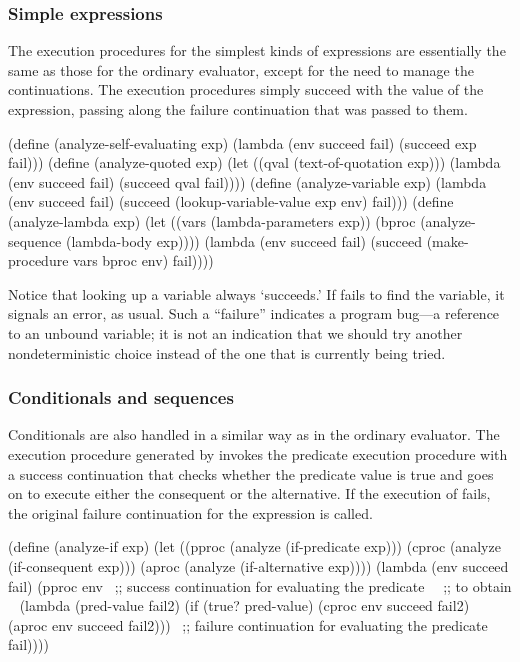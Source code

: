 \subsubsection*{Simple expressions}

The execution procedures for the simplest kinds of expressions are essentially
the same as those for the ordinary evaluator, except for the need to manage the
continuations.  The execution procedures simply succeed with the value of the
expression, passing along the failure continuation that was passed to them.

\begin{codeBlock}
(define (analyze-self-evaluating exp)
  (lambda (env succeed fail)
    (succeed exp fail)))
(define (analyze-quoted exp)
  (let ((qval (text-of-quotation exp)))
    (lambda (env succeed fail)
      (succeed qval fail))))
(define (analyze-variable exp)
  (lambda (env succeed fail)
    (succeed (lookup-variable-value exp env) fail)))
(define (analyze-lambda exp)
  (let ((vars (lambda-parameters exp))
        (bproc (analyze-sequence (lambda-body exp))))
    (lambda (env succeed fail)
      (succeed (make-procedure vars bproc env) fail))))
\end{codeBlock}

\noindent
Notice that looking up a variable always `succeeds.'  If
 fails to find the variable, it signals an error,
as usual.  Such a ``failure'' indicates a program bug---a reference to an
unbound variable; it is not an indication that we should try another
nondeterministic choice instead of the one that is currently being tried.

\subsubsection*{Conditionals and sequences}

Conditionals are also handled in a similar way as in the ordinary evaluator.
The execution procedure generated by  invokes the predicate
execution procedure  with a success continuation that checks
whether the predicate value is true and goes on to execute either the
consequent or the alternative.  If the execution of  fails, the
original failure continuation for the  expression is called.

\begin{codeBlock}
(define (analyze-if exp)
  (let ((pproc (analyze (if-predicate exp)))
        (cproc (analyze (if-consequent exp)))
        (aproc (analyze (if-alternative exp))))
    (lambda (env succeed fail)
      (pproc env
             ~\textrm{;; success continuation for evaluating the predicate}~
             ~\textrm{;; to obtain }~
             (lambda (pred-value fail2)
               (if (true? pred-value)
                   (cproc env succeed fail2)
                   (aproc env succeed fail2)))
             ~\textrm{;; failure continuation for evaluating the predicate}~
             fail))))
\end{codeBlock}

